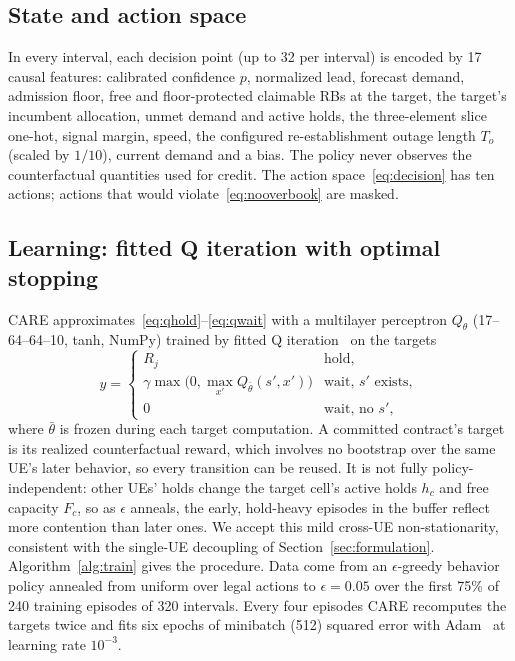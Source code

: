 \documentclass[conference]{IEEEtran}
\begin{document}
\subsection{State and action space}
In every interval, each decision point (up to 32 per interval) is encoded by 17 causal features: calibrated confidence $p$, normalized lead, forecast demand, admission floor, free and floor-protected claimable RBs at the target, the target's incumbent allocation, unmet demand and active holds, the three-element slice one-hot, signal margin, speed, the configured re-establishment outage length $T_o$ (scaled by $1/10$), current demand and a bias. The policy never observes the counterfactual quantities used for credit. The action space~\eqref{eq:decision} has ten actions; actions that would violate~\eqref{eq:nooverbook} are masked.

\subsection{Learning: fitted Q iteration with optimal stopping}
CARE approximates~\eqref{eq:qhold}--\eqref{eq:qwait} with a multilayer perceptron $Q_\theta$ (17--64--64--10, tanh, NumPy) trained by fitted Q iteration~\cite{ernst2005tree,riedmiller2005nfq} on the targets
\begin{equation}\label{eq:targets}
y=\begin{cases}R_j & \text{hold},\\ \gamma\max\big(0,\max_{x'}Q_{\bar\theta}(s',x')\big) & \text{wait, $s'$ exists},\\ 0 & \text{wait, no $s'$},\end{cases}
\end{equation}
where $\bar\theta$ is frozen during each target computation. A committed contract's target is its realized counterfactual reward, which involves no bootstrap over the same UE's later behavior, so every transition can be reused. It is not fully policy-independent: other UEs' holds change the target cell's active holds $h_c$ and free capacity $F_c$, so as $\epsilon$ anneals, the early, hold-heavy episodes in the buffer reflect more contention than later ones. We accept this mild cross-UE non-stationarity, consistent with the single-UE decoupling of Section~\ref{sec:formulation}. Algorithm~\ref{alg:train} gives the procedure. Data come from an $\epsilon$-greedy behavior policy annealed from uniform over legal actions to $\epsilon=0.05$ over the first 75\% of 240 training episodes of 320 intervals. Every four episodes CARE recomputes the targets twice and fits six epochs of minibatch (512) squared error with Adam~\cite{kingma2015adam} at learning rate $10^{-3}$.
\end{document}
